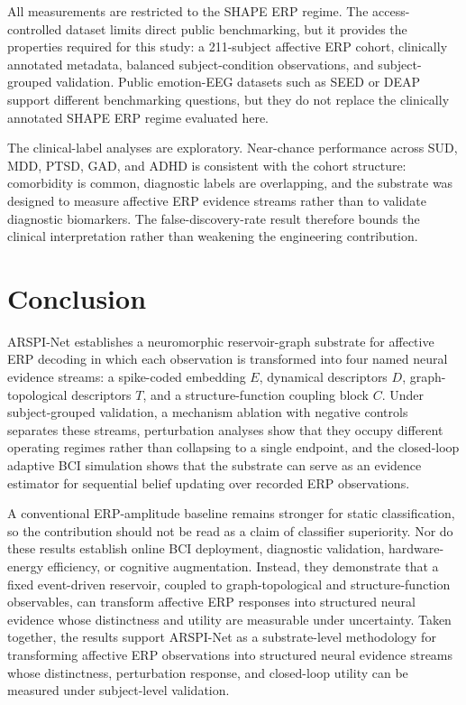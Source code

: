 \documentclass[journal]{IEEEtran}
\begin{document}
All measurements are restricted to the SHAPE ERP regime. The access-controlled dataset limits direct public benchmarking, but it provides the properties required for this study: a 211-subject affective ERP cohort, clinically annotated metadata, balanced subject-condition observations, and subject-grouped validation. Public emotion-EEG datasets such as SEED or DEAP support different benchmarking questions, but they do not replace the clinically annotated SHAPE ERP regime evaluated here.

The clinical-label analyses are exploratory. Near-chance performance across SUD, MDD, PTSD, GAD, and ADHD is consistent with the cohort structure: comorbidity is common, diagnostic labels are overlapping, and the substrate was designed to measure affective ERP evidence streams rather than to validate diagnostic biomarkers. The false-discovery-rate result therefore bounds the clinical interpretation rather than weakening the engineering contribution.

\section{Conclusion}
ARSPI-Net establishes a neuromorphic reservoir-graph substrate for affective ERP decoding in which each observation is transformed into four named neural evidence streams: a spike-coded embedding $E$, dynamical descriptors $D$, graph-topological descriptors $T$, and a structure-function coupling block $C$. Under subject-grouped validation, a mechanism ablation with negative controls separates these streams, perturbation analyses show that they occupy different operating regimes rather than collapsing to a single endpoint, and the closed-loop adaptive BCI simulation shows that the substrate can serve as an evidence estimator for sequential belief updating over recorded ERP observations.

A conventional ERP-amplitude baseline remains stronger for static classification, so the contribution should not be read as a claim of classifier superiority. Nor do these results establish online BCI deployment, diagnostic validation, hardware-energy efficiency, or cognitive augmentation. Instead, they demonstrate that a fixed event-driven reservoir, coupled to graph-topological and structure-function observables, can transform affective ERP responses into structured neural evidence whose distinctness and utility are measurable under uncertainty. Taken together, the results support ARSPI-Net as a substrate-level methodology for transforming affective ERP observations into structured neural evidence streams whose distinctness, perturbation response, and closed-loop utility can be measured under subject-level validation.
\end{document}
